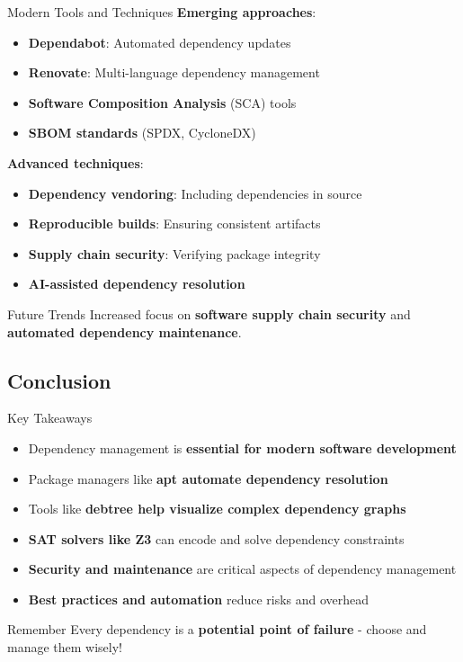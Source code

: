 \documentclass{beamer}
\begin{document}
\begin{frame}[t]{Modern Tools and Techniques}
\textbf{Emerging approaches}:
\begin{itemize}
\item \textbf{Dependabot}: Automated dependency updates
\item \textbf{Renovate}: Multi-language dependency management
\item \textbf{Software Composition Analysis} (SCA) tools
\item \textbf{SBOM standards} (SPDX, CycloneDX)
\end{itemize}

\bigskip

\textbf{Advanced techniques}:
\begin{itemize}
\item \textbf{Dependency vendoring}: Including dependencies in source
\item \textbf{Reproducible builds}: Ensuring consistent artifacts
\item \textbf{Supply chain security}: Verifying package integrity
\item \textbf{AI-assisted dependency resolution}
\end{itemize}

\bigskip

\begin{block}{Future Trends}
Increased focus on \textbf{software supply chain security} and \textbf{automated dependency maintenance}.
\end{block}
\end{frame}

\subsection{Conclusion}

\begin{frame}[t]{Key Takeaways}
\begin{itemize}
\item Dependency management is \textbf{essential for modern software development}
\item Package managers like \textbf{apt automate dependency resolution}
\item Tools like \textbf{debtree help visualize complex dependency graphs}
\item \textbf{SAT solvers like Z3} can encode and solve dependency constraints
\item \textbf{Security and maintenance} are critical aspects of dependency management
\item \textbf{Best practices and automation} reduce risks and overhead
\end{itemize}

\bigskip

\begin{alertblock}{Remember}
Every dependency is a \textbf{potential point of failure} - choose and manage them wisely!
\end{alertblock}
\end{frame}
\end{document}
